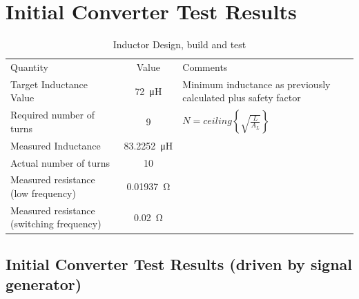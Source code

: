 \section{Initial Converter Test Results}

\begin{table}[h]
	\centering
	\caption{Inductor Design, build and test}
	\begin{tabular}{lcl}
		\toprule
		Quantity&Value&Comments\\
		\cmidrule(r){1-1}\cmidrule(lr){2-2}\cmidrule(l){3-3}
		Target Inductance Value & \SI{72}{\micro\henry} & Minimum inductance as previously calculated plus safety factor \\
		Required number of turns & 9 & $N=ceiling\left\lbrace \sqrt{\frac{L}{A_L}}\right\rbrace$ \\
		Measured Inductance & \SI{83.2252}{\micro\henry} & \\
		Actual number of turns & 10 & \\
		Measured resistance (low frequency) & \SI{0.01937}{\ohm} & \\
		Measured resistance (switching frequency) & \SI{0.02}{\ohm} & \\
		\bottomrule
	\end{tabular}
\end{table}

\subsection{Initial Converter Test Results (driven by signal generator)}




